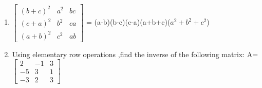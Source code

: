 \begin{enumerate}
    \item $\begin{bmatrix}(b+c)^{2}&a^{2}&bc\\(c+a)^{2}&b^{2}&ca\\(a+b)^{2}&c^{2}&ab \end{bmatrix}$ = (a-b)(b-c)(c-a)(a+b+c)($a^{2}+b^{2}+c^{2}$)
    \item Using elementary row operations ,find the inverse of the following matrix:
          A=$\begin{bmatrix} 2 & -1 & 3 \\-5&3&1\\-3&2&3
              \end{bmatrix}$
\end{enumerate}
